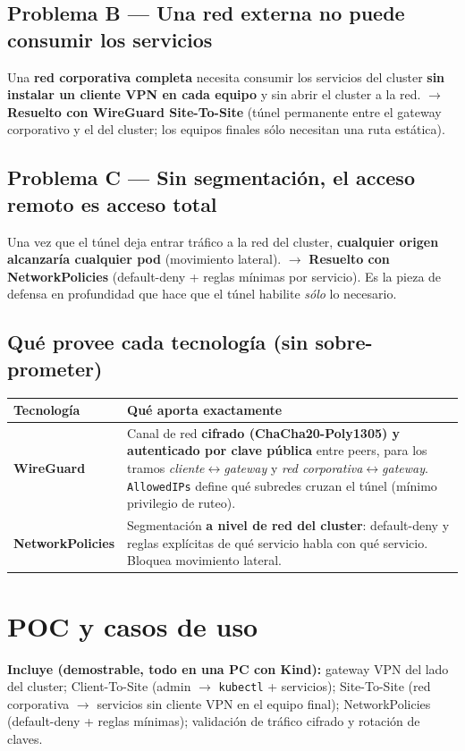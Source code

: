 \documentclass[11pt,a4paper]{article}
\newcommand{\cmd}[1]{\texttt{#1}}
\begin{document}
\subsection*{Problema B — Una red externa no puede consumir los servicios}
Una \textbf{red corporativa completa} necesita consumir los servicios del cluster
\textbf{sin instalar un cliente VPN en cada equipo} y sin abrir el cluster a la
red. \;$\rightarrow$\; \textbf{Resuelto con WireGuard Site-To-Site} (túnel
permanente entre el gateway corporativo y el del cluster; los equipos finales
sólo necesitan una ruta estática).

\subsection*{Problema C — Sin segmentación, el acceso remoto es acceso total}
Una vez que el túnel deja entrar tráfico a la red del cluster, \textbf{cualquier
origen alcanzaría cualquier pod} (movimiento lateral). \;$\rightarrow$\;
\textbf{Resuelto con NetworkPolicies} (default-deny + reglas mínimas por
servicio). Es la pieza de defensa en profundidad que hace que el túnel habilite
\emph{sólo} lo necesario.

\subsection*{Qué provee cada tecnología (sin sobre-prometer)}
\renewcommand{\arraystretch}{1.3}
\begin{tabularx}{\linewidth}{@{}>{\bfseries}p{2.8cm} X@{}}
\toprule
Tecnología & Qué aporta exactamente \\
\midrule
WireGuard & Canal de red \textbf{cifrado (ChaCha20-Poly1305) y autenticado por
clave pública} entre peers, para los tramos \emph{cliente$\leftrightarrow$gateway}
y \emph{red corporativa$\leftrightarrow$gateway}. \cmd{AllowedIPs} define qué
subredes cruzan el túnel (mínimo privilegio de ruteo). \\
NetworkPolicies & Segmentación \textbf{a nivel de red del cluster}: default-deny y
reglas explícitas de qué servicio habla con qué servicio. Bloquea movimiento
lateral. \\
\bottomrule
\end{tabularx}

\section{POC y casos de uso}
\textbf{Incluye (demostrable, todo en una PC con Kind):} gateway VPN del lado del
cluster; Client-To-Site (admin $\rightarrow$ \cmd{kubectl} + servicios);
Site-To-Site (red corporativa $\rightarrow$ servicios sin cliente VPN en el
equipo final); NetworkPolicies (default-deny + reglas mínimas); validación de
tráfico cifrado y rotación de claves.
\end{document}
